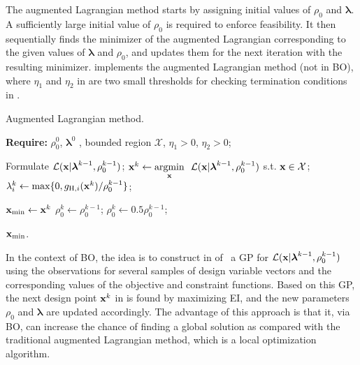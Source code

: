 \documentclass[iicol,sn-basic]{sn-jnl}%
\begin{document}
The augmented Lagrangian method starts by assigning initial values of $\rho_0$ and $\boldsymbol{\lambda}$.
A sufficiently large initial value of $\rho_0$ is required to enforce feasibility.
It then sequentially finds the minimizer of the augmented Lagrangian corresponding to the given values of $\boldsymbol{\lambda}$ and $\rho_0$, and updates them for the next iteration with the resulting minimizer.
 implements the augmented Lagrangian method (not in BO), where
$\eta_1$ and $\eta_2$ in  are two small thresholds for checking termination conditions in .    
\begin{algorithm}
	\caption{Augmented Lagrangian method.}\label{Algo6}
	\begin{algorithmic}[1]
		\State \textbf{Require:} $\rho^0_0$, $\boldsymbol{\lambda}^0$ , bounded region $\mathcal{X}$, $\eta_1>0$, $\eta_2>0$; \label{Algo6:1}
		
		\State Formulate $\mathcal{L}({\bf x}|\boldsymbol{\lambda}^{k-1},\rho^{k-1}_0)$; \label{Algo6:3}
		\State ${\bf x}^{k} \gets \underset{{\bf x}}{\mathrm{argmin}} \ \ \mathcal{L}({\bf x}|\boldsymbol{\lambda}^{k-1},\rho^{k-1}_0)$ s.t. ${\bf x} \in \mathcal{X}$; \label{Algo6:4}
		\State ${\lambda}^k_i \gets \max \{0,g_{\text{H},i}({\bf x}^k)/\rho^{k-1}_0\}$;
		
		 \label{Algo6:6}
			\State ${\bf x}_{\min} \gets {\bf x}^{k}$
		\Else
				\State $\rho^k_0 \gets \rho^{k-1}_0$;
			\Else
				\State $\rho^k_0 \gets 0.5\rho^{k-1}_0$;
			\EndIf  	
		\EndIf 
		\EndFor
		
		\State \Return ${\bf x}_{\min}$.
	\end{algorithmic}
\end{algorithm}

In the context of BO, the idea is to construct in  of~ a GP for $\mathcal{L}({\bf x}|\boldsymbol{\lambda}^{k-1},\rho^{k-1}_0)$ using the observations for several samples of design variable vectors and the corresponding values of the objective and constraint functions.
Based on this GP, the next design point ${\bf x}^{k}$ in  is found by maximizing EI, and the new parameters $\rho_0$ and $\boldsymbol{\lambda}$ are updated accordingly.
The advantage of this approach is that it, via BO, can increase the chance of finding a global solution as compared with the traditional augmented Lagrangian method, which is a local optimization algorithm.
\end{document}
